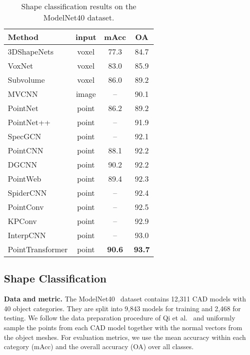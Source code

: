 \documentclass[final]{cvpr}
\begin{document}
\begin{table}[h]
	\centering
	\begin{tabular}{ l | c c c}
		\toprule[1pt]
		Method & input & mAcc & OA \\
		\hline
		3DShapeNets~\cite{wu2015modelnet} & voxel & 77.3 & 84.7 \\
		VoxNet~\cite{maturana2015voxnet} & voxel & 83.0 & 85.9 \\
		Subvolume~\cite{qi2016volumetric} & voxel & 86.0 & 89.2 \\
		MVCNN~\cite{su15mvcnn} & image & -- & 90.1 \\
		PointNet~\cite{qi2017pointnet} & point & 86.2 & 89.2 \\
		PointNet++~\cite{qi2017pointnet2} & point & -- & 91.9 \\
		SpecGCN~\cite{wang2018local} & point & -- & 92.1 \\
		PointCNN~\cite{li2018pointcnn} & point & 88.1 & 92.2 \\
		DGCNN~\cite{wang2019dgcnn} & point & 90.2 & 92.2 \\
		PointWeb~\cite{zhao2019pointweb} & point & 89.4 & 92.3 \\
		SpiderCNN~\cite{xu2018spidercnn} & point & -- & 92.4 \\
		PointConv~\cite{wu2019pointconv} & point & -- & 92.5 \\
		KPConv~\cite{thomas2019kpconv} & point & -- & 92.9 \\
		InterpCNN~\cite{mao2019interpolated} & point & -- & 93.0 \\
		\hline
		PointTransformer & point & \textbf{90.6} & \textbf{93.7} \\
		\bottomrule[1pt]
	\end{tabular}
	\caption{Shape classification results on the ModelNet40 dataset.}
	\label{tab:modelnet40result}
	\vspace{-2mm}
\end{table}

\subsection{Shape Classification}

\noindent\textbf{Data and metric.}
The ModelNet40~\cite{wu2015modelnet} dataset contains 12,311 CAD models with 40 object categories. They are split into 9,843 models for training and 2,468 for testing. We follow the data preparation procedure of Qi et al.~\cite{qi2017pointnet2} and uniformly sample the points from each CAD model together with the normal vectors from the object meshes. For evaluation metrics, we use the mean accuracy within each category (mAcc) and the overall accuracy (OA) over all classes.
\end{document}
